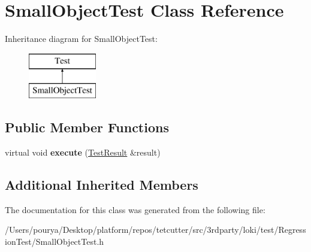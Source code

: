 \hypertarget{classSmallObjectTest}{}\section{Small\+Object\+Test Class Reference}
\label{classSmallObjectTest}
Inheritance diagram for Small\+Object\+Test\+:\begin{figure}[H]
\begin{center}
\leavevmode
\includegraphics[height=2.000000cm]{classSmallObjectTest}
\end{center}
\end{figure}
\subsection*{Public Member Functions}
\begin{DoxyCompactItemize}
\item 
\hypertarget{classSmallObjectTest_af3dc61afde2355c57f457fd468af4c4a}{}virtual void {\bfseries execute} (\hyperlink{classTestResult}{Test\+Result} \&result)\label{classSmallObjectTest_af3dc61afde2355c57f457fd468af4c4a}

\end{DoxyCompactItemize}
\subsection*{Additional Inherited Members}


The documentation for this class was generated from the following file\+:\begin{DoxyCompactItemize}
\item 
/\+Users/pourya/\+Desktop/platform/repos/tetcutter/src/3rdparty/loki/test/\+Regression\+Test/Small\+Object\+Test.\+h\end{DoxyCompactItemize}
